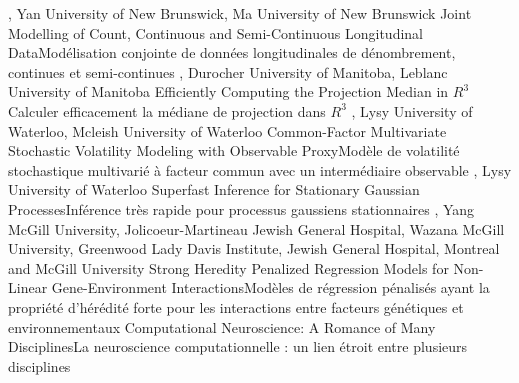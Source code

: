 {
,  {Yan}
{University of New Brunswick},  {Ma}
{University of New Brunswick}
}
{Joint Modelling of Count, Continuous and Semi-Continuous Longitudinal Data}{Modélisation conjointe de données longitudinales de dénombrement, continues et semi-continues}
{\bubbleE \enspace \screenE}
{
,  {Durocher}
{University of Manitoba},  {Leblanc}
{University of Manitoba}
}
{Efficiently Computing the Projection Median in $R^3$}{Calculer efficacement la médiane de projection dans $R^3$}
{\bubbleE \enspace \screenE}
{
,  {Lysy}
{University of Waterloo},  {Mcleish}
{University of Waterloo}
}
{Common-Factor Multivariate Stochastic Volatility Modeling with Observable Proxy}{Modèle de volatilité stochastique multivarié à facteur commun avec un intermédiaire observable}
{\bubbleE \enspace \screenE}
{
,  {Lysy}
{University of Waterloo}
}
{Superfast Inference for Stationary Gaussian Processes}{Inférence très rapide pour processus gaussiens stationnaires}
{\bubbleE \enspace \screenE}
{
,  {Yang}
{McGill University},  {Jolicoeur-Martineau}
{Jewish General Hospital},  {Wazana}
{McGill University},  {Greenwood}
{Lady Davis Institute, Jewish General Hospital, Montreal and McGill University}
}
{Strong Heredity Penalized Regression Models for Non-Linear Gene-Environment Interactions}{Modèles de régression pénalisés ayant la propriété d’hérédité forte pour les interactions entre facteurs génétiques et environnementaux}
{\bubbleE \enspace \screenE}
{
}
{Computational Neuroscience: A Romance of Many Disciplines}{La neuroscience computationnelle : un lien étroit entre plusieurs disciplines }
{\bubbleE \enspace \screenE}


